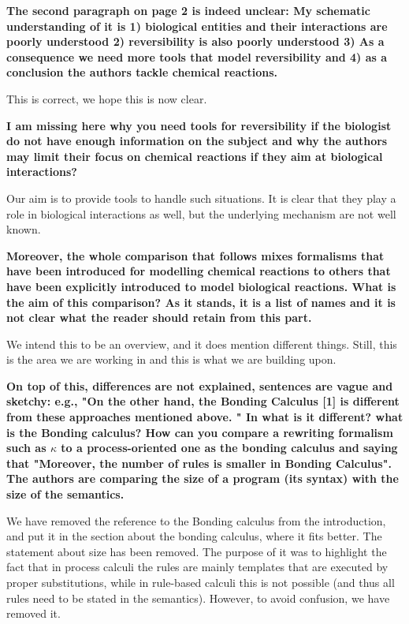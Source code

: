 \documentclass{article}
\begin{document}
\textbf{The second paragraph on page 2 is indeed unclear:
My schematic understanding of it is 1) biological entities and their interactions are poorly understood 2) reversibility is also poorly understood 3) As a consequence we need more tools that model reversibility and 4) as a conclusion the authors tackle chemical reactions.}

This is correct, we hope this is now clear.

\textbf{I am missing here why you need tools for reversibility if the biologist do not have enough information on the subject and why the authors may limit their focus on chemical reactions if they aim at biological interactions?}

Our aim is to provide tools to handle such situations. It is clear that they play a role in biological interactions as well, but the underlying mechanism are not well known.

\textbf{Moreover, the whole comparison that follows mixes formalisms that have been introduced for modelling chemical reactions to others that have been explicitly introduced to model biological reactions. What is the aim of this comparison? As it stands, it is a list of names and it is not clear what the reader should retain from this part.}

We intend this to be an overview, and it does mention different things. Still, this is the area we are working in and this is what we are building upon.

\textbf{On top of this, differences are not explained, sentences are vague and sketchy:
 e.g., "On the other hand, the Bonding Calculus [1] is different from these approaches mentioned above. "
 In what is it different?  what is the Bonding calculus?
How can you compare a rewriting formalism such as $\kappa$ to a process-oriented one as the bonding calculus and saying that "Moreover, the number of rules is smaller in Bonding Calculus". The authors are comparing the size of a program (its syntax) with the size of the semantics.}

We have removed the reference to the Bonding calculus from the introduction, and put it in the section about the bonding calculus, where it fits better. The statement about size has been removed. The purpose of it was to highlight the fact that in process
calculi the rules are mainly templates that are executed by proper
substitutions, while in rule-based calculi this is not possible (and thus all
rules need to be stated in the semantics). However, to avoid confusion, we have removed it.
\end{document}
